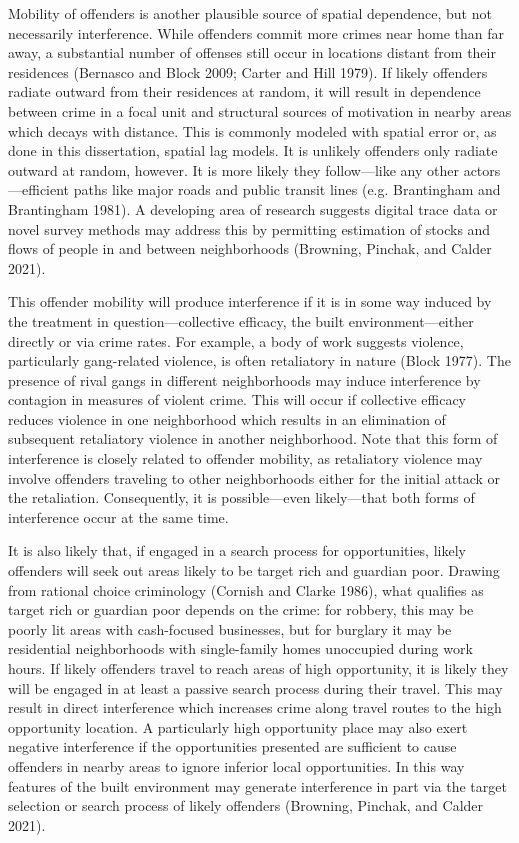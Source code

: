 \documentclass [11pt, proquest] {uwthesis}[2015/03/03]
\begin{document}
Mobility of offenders is another plausible source of spatial dependence, but not necessarily interference. While offenders commit more crimes near home than far away, a substantial number of offenses still occur in locations distant from their residences (Bernasco and Block 2009; Carter and Hill 1979). If likely offenders radiate outward from their residences at random, it will result in dependence between crime in a focal unit and structural sources of motivation in nearby areas which decays with distance. This is commonly modeled with spatial error or, as done in this dissertation, spatial lag models. It is unlikely offenders only radiate outward at random, however. It is more likely they follow---like any other actors---efficient paths like major roads and public transit lines (e.g. Brantingham and Brantingham 1981). A developing area of research suggests digital trace data or novel survey methods may address this by permitting estimation of stocks and flows of people in and between neighborhoods (Browning, Pinchak, and Calder 2021).

This offender mobility will produce interference if it is in some way induced by the treatment in question---collective efficacy, the built environment---either directly or via crime rates. For example, a body of work suggests violence, particularly gang-related violence, is often retaliatory in nature (Block 1977). The presence of rival gangs in different neighborhoods may induce interference by contagion in measures of violent crime. This will occur if collective efficacy reduces violence in one neighborhood which results in an elimination of subsequent retaliatory violence in another neighborhood. Note that this form of interference is closely related to offender mobility, as retaliatory violence may involve offenders traveling to other neighborhoods either for the initial attack or the retaliation. Consequently, it is possible---even likely---that both forms of interference occur at the same time.

It is also likely that, if engaged in a search process for opportunities, likely offenders will seek out areas likely to be target rich and guardian poor. Drawing from rational choice criminology (Cornish and Clarke 1986), what qualifies as target rich or guardian poor depends on the crime: for robbery, this may be poorly lit areas with cash-focused businesses, but for burglary it may be residential neighborhoods with single-family homes unoccupied during work hours. If likely offenders travel to reach areas of high opportunity, it is likely they will be engaged in at least a passive search process during their travel. This may result in direct interference which increases crime along travel routes to the high opportunity location. A particularly high opportunity place may also exert negative interference if the opportunities presented are sufficient to cause offenders in nearby areas to ignore inferior local opportunities. In this way features of the built environment may generate interference in part via the target selection or search process of likely offenders (Browning, Pinchak, and Calder 2021).
\end{document}
